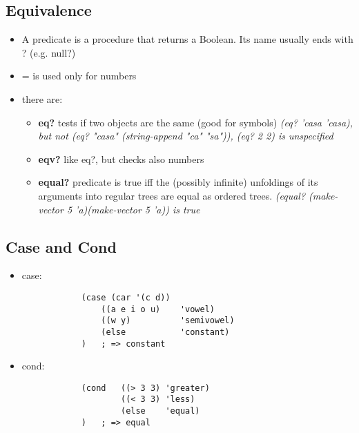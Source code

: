 \subsection{Equivalence}
\begin{itemize}
    \item A predicate is a procedure that returns a Boolean. Its name usually ends with ? (e.g. null?)
    \item = is used only for numbers
    \item there are:
    \begin{itemize}
        \item \textbf{eq?} tests if two objects are the same (good for symbols) \textit{(eq? ’casa ’casa), but not (eq? "casa" (string-append "ca" "sa")), (eq? 2 2) is unspecified}
        \item \textbf{eqv?} like eq?, but checks also numbers
        \item \textbf{equal?} predicate is true iff the (possibly infinite) unfoldings of its arguments into regular trees are equal as ordered trees. \textit{(equal? (make-vector 5 'a)(make-vector 5 'a)) is true}
    \end{itemize}
\end{itemize}

\subsection{Case and Cond}
\begin{itemize}
    \item case:
        \begin{lstlisting}
            (case (car '(c d))
                ((a e i o u)    'vowel)
                ((w y)          'semivowel)
                (else           'constant) 
            )   ; => constant
        \end{lstlisting}
    \item cond:
        \begin{lstlisting}
            (cond   ((> 3 3) 'greater)
                    ((< 3 3) 'less)
                    (else    'equal)
            )   ; => equal
        \end{lstlisting}
\end{itemize}

